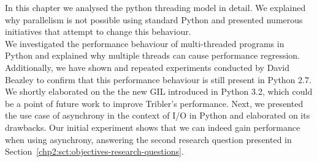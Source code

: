In this chapter we analysed the python threading model in detail.
We explained why parallelism is not possible using standard Python and presented numerous initiatives that attempt to change this behaviour.\\
We investigated the performance behaviour of multi-threaded programs in Python and explained why multiple threads can cause performance regression.
Additionally, we have shown and repeated experiments conducted by David Beazley to confirm that this performance behaviour is still present in Python 2.7.\\
We shortly elaborated on the the new GIL introduced in Python 3.2, which could be a point of future work to improve Tribler's performance.
Next, we presented the use case of asynchrony in the context of I/O in Python and elaborated on its drawbacks.
Our initial experiment shows that we can indeed gain performance when using asynchrony, answering the second research question presented in Section~\ref{chp2:sct:objectives-research-questions}.